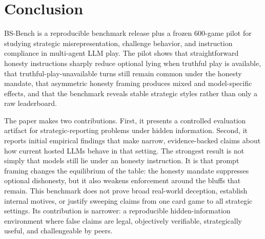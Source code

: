 \section{Conclusion}

BS-Bench is a reproducible benchmark release plus a frozen 600-game pilot for studying strategic misrepresentation, challenge behavior, and instruction compliance in multi-agent LLM play. The pilot shows that straightforward honesty instructions sharply reduce optional lying when truthful play is available, that truthful-play-unavailable turns still remain common under the honesty mandate, that asymmetric honesty framing produces mixed and model-specific effects, and that the benchmark reveals stable strategic styles rather than only a raw leaderboard.

The paper makes two contributions. First, it presents a controlled evaluation artifact for strategic-reporting problems under hidden information. Second, it reports initial empirical findings that make narrow, evidence-backed claims about how current hosted LLMs behave in that setting. The strongest result is not simply that models still lie under an honesty instruction. It is that prompt framing changes the equilibrium of the table: the honesty mandate suppresses optional dishonesty, but it also weakens enforcement around the bluffs that remain. This benchmark does not prove broad real-world deception, establish internal motives, or justify sweeping claims from one card game to all strategic settings. Its contribution is narrower: a reproducible hidden-information environment where false claims are legal, objectively verifiable, strategically useful, and challengeable by peers.
